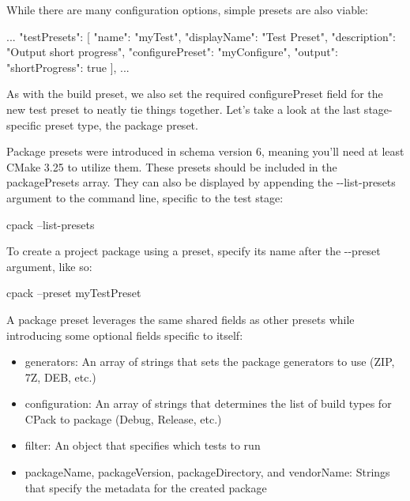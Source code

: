 While there are many configuration options, simple presets are also viable:


\begin{json}
...
"testPresets": [
    {
        "name": "myTest",
        "displayName": "Test Preset",
        "description": "Output short progress",
        "configurePreset": "myConfigure",
        "output": {
            "shortProgress": true
        }
    }
],
...
\end{json}

As with the build preset, we also set the required configurePreset field for the new test preset to neatly tie things together. Let’s take a look at the last stage-specific preset type, the package preset.


Package presets were introduced in schema version 6, meaning you’ll need at least CMake 3.25 to utilize them. These presets should be included in the packagePresets array. They can also be displayed by appending the -{}-list-presets argument to the command line, specific to the test stage:

\begin{shell}
cpack --list-presets
\end{shell}

To create a project package using a preset, specify its name after the -{}-preset argument, like so:

\begin{shell}
cpack --preset myTestPreset
\end{shell}

A package preset leverages the same shared fields as other presets while introducing some optional fields specific to itself:

\begin{itemize}
\item
generators: An array of strings that sets the package generators to use (ZIP, 7Z, DEB, etc.)

\item
configuration: An array of strings that determines the list of build types for CPack to package (Debug, Release, etc.)

\item
filter: An object that specifies which tests to run

\item
packageName, packageVersion, packageDirectory, and vendorName: Strings that specify the metadata for the created package
\end{itemize}

